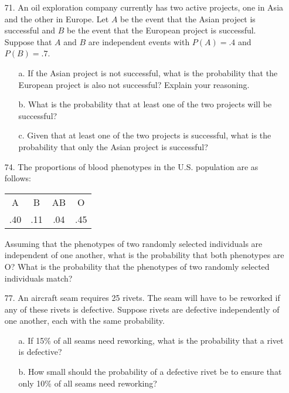 \documentclass[letterpaper,12pt]{article}
\begin{document}
\maketitle

\begin{enumerate}
  \item[71.]
    An oil exploration company currently has two active projects, one in Asia and the other in Europe. Let $A$ be the event that the Asian project is successful and $B$ be the event that the European project is successful. Suppose that $A$ and $B$ are independent events with $P(A) = .4$ and $P(B) = .7$.
    \begin{enumerate}
      \item[a.]
        If the Asian project is not successful, what is the probability that the European project is also not successful? Explain your reasoning.
      \item[b.]
        What is the probability that at least one of the two projects will be successful?
      \item[c.]
        Given that at least one of the two projects is successful, what is the probability that only the Asian project is successful?
    \end{enumerate}
  \item[74.]
    The proportions of blood phenotypes in the U.S. population are as follows:
    \begin{center}
      \begin{tabular}{cccc}
        A & B & AB & O \\
        .40 & .11 & .04 & .45
      \end{tabular}
    \end{center}
    Assuming that the phenotypes of two randomly selected individuals are independent of one another, what is the probability that both phenotypes are O? What is the probability that the phenotypes of two randomly selected individuals match?
  \item[77.]
    An aircraft seam requires 25 rivets. The seam will have to be reworked if any of these rivets is defective. Suppose rivets are defective independently of one another, each with the same probability.
    \begin{enumerate}
      \item[a.]
        If 15\% of all seams need reworking, what is the probability that a rivet is defective?
      \item[b.]
        How small should the probability of a defective rivet be to ensure that only 10\% of all seams need reworking?

\end{enumerate}
\end{enumerate}
\end{document}
